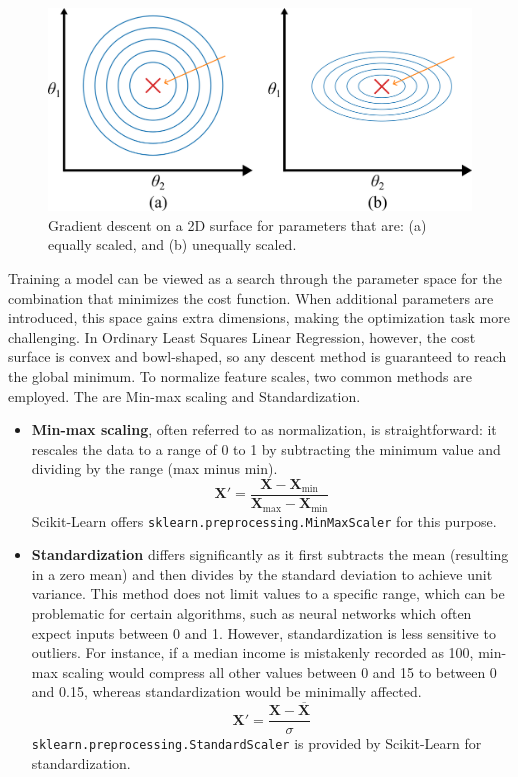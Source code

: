 \documentclass[12pt,letter]{article}
\begin{document}
\begin{figure}[H]
    \centering
    \includegraphics[]{../figures/gradient_descent_5.png }
		\vspace{-1ex}
    \caption{Gradient descent on a 2D surface for parameters that are: (a) equally scaled, and (b) unequally scaled.}
		\vspace{-1ex}
    \label{fig:gradient_descent_5}
\end{figure}



Training a model can be viewed as a search through the parameter space for the combination that minimizes the cost function. When additional parameters are introduced, this space gains extra dimensions, making the optimization task more challenging. In Ordinary Least Squares Linear Regression, however, the cost surface is convex and bowl-shaped, so any descent method is guaranteed to reach the global minimum. To normalize feature scales, two common methods are employed. The are Min-max scaling and Standardization. 
\begin{itemize}
\item \textbf{Min-max scaling}, often referred to as normalization, is straightforward: it rescales the data to a range of 0 to 1 by subtracting the minimum value and dividing by the range (max minus min).
\begin{equation}
\textbf{X}' = \frac{\textbf{X} - \textbf{X}_\text{min}}{\textbf{X}_\text{max} - \textbf{X}_\text{min}}
\end{equation}
Scikit-Learn offers \texttt{sklearn.preprocessing.MinMaxScaler} for this purpose.
\item \textbf{Standardization} differs significantly as it first subtracts the mean (resulting in a zero mean) and then divides by the standard deviation to achieve unit variance. This method does not limit values to a specific range, which can be problematic for certain algorithms, such as neural networks which often expect inputs between 0 and 1. However, standardization is less sensitive to outliers. For instance, if a median income is mistakenly recorded as 100, min-max scaling would compress all other values between 0 and 15 to between 0 and 0.15, whereas standardization would be minimally affected.
\begin{equation}
\textbf{X}' = \frac{\textbf{X} - \overline{\textbf{X}}}{\sigma}
\end{equation}
\texttt{sklearn.preprocessing.StandardScaler} is provided by Scikit-Learn for standardization.
\end{itemize}
\end{document}
